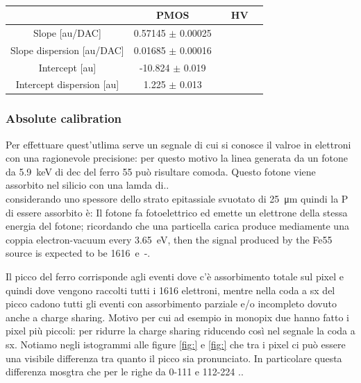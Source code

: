         \begin{table}
            \begin{center}
            \begin{tabular}{| c |  c | c | c |c |}
            \hline
             & PMOS & & HV \\
            \hline
            \hline
            Slope [au/DAC] & 0.57145 $\pm$ 0.00025 \\
            Slope dispersion [au/DAC] &  0.01685 $\pm$ 0.00016\\
            Intercept [au] & -10.824 $\pm$ 0.019 \\
            Intercept dispersion [au] & 1.225 $\pm$ 0.013\\
            \hline
            \end{tabular}
            \caption{}
            \label{tab:}
            \end{center}
        \end{table}        

        \subsubsection{Absolute calibration}
        Per effettuare quest'utlima serve un segnale di cui si conosce il valroe in elettroni con una ragionevole precisione: per questo motivo la linea generata da un fotone da \SI{5.9}{keV} di dec del ferro 55 può risultare comoda. 
        Questo fotone viene assorbito nel silicio con una lamda di.. \\
        considerando uno spessore dello strato epitassiale svuotato di \SI{25}{\um} quindi la P di essere assorbito è: 
        Il fotone fa fotoelettrico ed emette un elettrone della stessa energia del fotone; ricordando che una particella carica produce mediamente una coppia electron-vacuum every \SI{3.65}{eV}, then the signal produced by the Fe55 source is expected to be \SI{1616}{e-}. 
        
        Il picco del ferro corrisponde agli eventi dove c'è assorbimento totale sul pixel e quindi dove vengono raccolti tutti i 1616 elettroni, mentre nella coda a sx del picco cadono tutti gli eventi con assorbimento parziale e/o incompleto dovuto anche a charge sharing.  
        Motivo per cui ad esempio in monopix due hanno fatto i pixel più piccoli: per ridurre la charge sharing riducendo così nel segnale la coda a sx. 
        Notiamo negli istogrammi alle figure \ref{fig:} e \ref{fig:} che tra i pixel ci può essere una visibile differenza tra quanto il picco sia pronunciato. In particolare questa differenza mosgtra che per le righe da 0-111 e 112-224 ..

